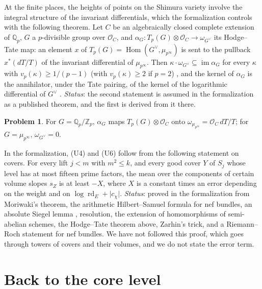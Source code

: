 \documentclass[reqno]{amsart}
\theoremstyle{definition}
\newtheorem{problem}{Problem}[section]
\theoremstyle{plain}
\theoremstyle{remark}
\newcommand{\Z}{\mathbb Z}
\newcommand{\Q}{\mathbb Q}
\newcommand{\Oc}{\mathcal O}
\newcommand{\rd}{\operatorname{rd}}
\begin{document}
At the finite places, the heights of points on the Shimura variety involve the integral structure of the invariant differentials, which the formalization controls with the following theorem.  Let \(C\) be an algebraically closed complete extension of \(\Q_p\), \(G\) a \(p\)-divisible group over \(\Oc_C\), and \(\alpha_G \colon T_p(G) \otimes \Oc_C \to \omega_{G^\vee}\) its Hodge--Tate map: an element \(x\) of \(T_p(G) = \operatorname{Hom}(G^\vee, \mu_{p^\infty})\) is sent to the pullback \(x^*(dT/T)\) of the invariant differential of \(\mu_{p^\infty}\).  Then \(\kappa\cdot\omega_{G^\vee} \subseteq \operatorname{im}\alpha_G\) for every \(\kappa\) with \(v_p(\kappa) \ge 1/(p-1)\) (with \(v_p(\kappa) \ge 2\) if \(p = 2\)) \cite{Fa}, and the kernel of \(\alpha_G\) is the annihilator, under the Tate pairing, of the kernel of the logarithmic differential of \(G^\vee\) \cite{ALB}.  \emph{Status}: the second statement is assumed in the formalization as a published theorem, and the first is derived from it there.

\begin{problem}\label{pr:HT-mult}
For \(G = \Q_p/\Z_p\), \(\alpha_G\) maps \(T_p(G) \otimes \Oc_C\) onto \(\omega_{\mu_{p^\infty}} = \Oc_C\,dT/T\); for \(G = \mu_{p^\infty}\), \(\omega_{G^\vee} = 0\).
\end{problem}

In the formalization, (U4) and (U6) follow from the following statement on covers.  For every lift \(j < m\) with \(m^2 \le k\), and every good cover \(Y\) of \(S_j\) whose level has at most fifteen prime factors, the mean over the components of certain volume slopes \(s_Z\) is at least \(-X\), where \(X\) is a constant times an error depending on the weight and on \(\log\rd_E + \lvert c_\chi\rvert\).  \emph{Status}: proved in the formalization from Moriwaki's theorem, the arithmetic Hilbert--Samuel formula for nef bundles, an absolute Siegel lemma \cite[\S4.3]{Zh}, resolution, the extension of homomorphisms of semi-abelian schemes, the Hodge--Tate theorem above, Zarhin's trick, and a Riemann--Roch statement for nef bundles.  We have not followed this proof, which goes through towers of covers and their volumes, and we do not state the error term.

\section{Back to the core level}\label{sec:descend}
\end{document}
